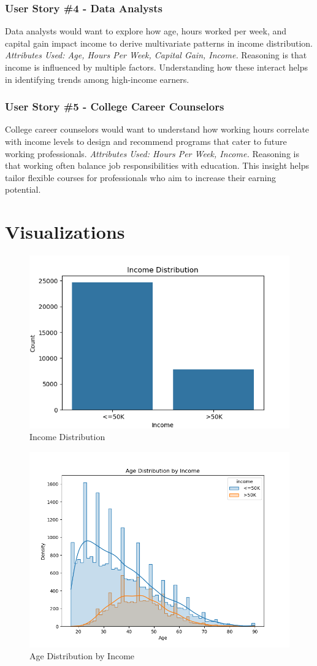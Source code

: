 \documentclass[journal,onecolumn]{IEEEtran}
\begin{document}
\subsubsection{User Story \#4 - Data Analysts} Data analysts would want to explore how age, 
hours worked per week, and capital gain impact income to derive multivariate 
patterns in income distribution. \textit{Attributes Used: Age, Hours Per Week, Capital 
Gain, Income.} Reasoning is that income is influenced by multiple factors. 
Understanding how these interact helps in identifying trends among high-income earners.
\subsubsection{User Story \#5 - College Career Counselors} College career counselors would want 
to understand how working hours correlate with income levels to design and 
recommend programs that cater to future working professionals. \textit{Attributes Used: 
Hours Per Week, Income.} Reasoning is that working often balance job responsibilities 
with education. This insight helps tailor flexible courses for professionals who 
aim to increase their earning potential.

\section{Visualizations} 
\begin{figure}[h]
  \centering
  \includegraphics[width=0.5\linewidth]{1_IncomeDistribution.png}
  \caption{Income Distribution}
  \label{fig:income-distribution}
\end{figure}

\begin{figure}[h]
  \centering
  \includegraphics[width=0.5\linewidth]{2_AgeDistributionbyIncome.png}
  \caption{Age Distribution by Income}
  \label{fig:age-distribution-by-income}
\end{figure}
\end{document}
